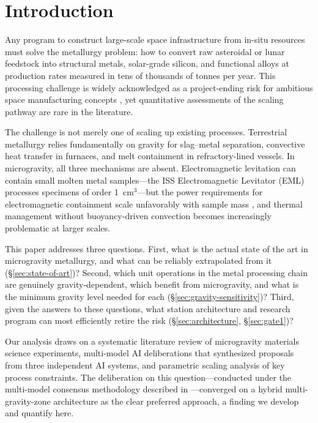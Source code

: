\documentclass[preprint,12pt]{elsarticle}
\begin{document}
\linenumbers

\section{Introduction}
\label{sec:introduction}

Any program to construct large-scale space infrastructure from in-situ resources must solve the metallurgy problem: how to convert raw asteroidal or lunar feedstock into structural metals, solar-grade silicon, and functional alloys at production rates measured in tens of thousands of tonnes per year. This processing challenge is widely acknowledged as a project-ending risk for ambitious space manufacturing concepts \cite{freitas1982,metzger2013,ellery2022}, yet quantitative assessments of the scaling pathway are rare in the literature.

The challenge is not merely one of scaling up existing processes. Terrestrial metallurgy relies fundamentally on gravity for slag--metal separation, convective heat transfer in furnaces, and melt containment in refractory-lined vessels. In microgravity, all three mechanisms are absent. Electromagnetic levitation can contain small molten metal samples---the ISS Electromagnetic Levitator (EML) processes specimens of order 1~cm$^3$---but the power requirements for electromagnetic containment scale unfavorably with sample mass \cite{mikellides2014}, and thermal management without buoyancy-driven convection becomes increasingly problematic at larger scales.

This paper addresses three questions. First, what is the actual state of the art in microgravity metallurgy, and what can be reliably extrapolated from it (\S\ref{sec:state-of-art})? Second, which unit operations in the metal processing chain are genuinely gravity-dependent, which benefit from microgravity, and what is the minimum gravity level needed for each (\S\ref{sec:gravity-sensitivity})? Third, given the answers to these questions, what station architecture and research program can most efficiently retire the risk (\S\ref{sec:architecture}, \S\ref{sec:gate1})?

Our analysis draws on a systematic literature review of microgravity materials science experiments, multi-model AI deliberations that synthesized proposals from three independent AI systems, and parametric scaling analysis of key process constraints. The deliberation on this question---conducted under the multi-model consensus methodology described in \cite{hakkenberg2026consensus}---converged on a hybrid multi-gravity-zone architecture as the clear preferred approach, a finding we develop and quantify here.
\end{document}
